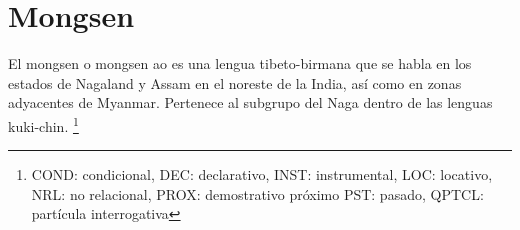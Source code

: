 \section*{Mongsen}

\noindent El mongsen o mongsen ao es una lengua tibeto-birmana que se habla en los estados de Nagaland y Assam en el noreste de la India, así como en zonas adyacentes de Myanmar. Pertenece al subgrupo del Naga dentro de las lenguas kuki-chin.
\footnote{COND: condicional, DEC: declarativo, INST: instrumental, LOC: locativo, NRL: no relacional, PROX: demostrativo próximo PST: pasado, QPTCL: partícula interrogativa}
\vspace{0.5cm}

